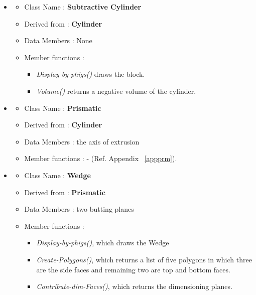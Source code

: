 \begin{itemize}
	\item

        \begin{itemize}
        \item   Class Name :    {\bf Subtractive Cylinder}
        \item   Derived from :  {\bf Cylinder}
        \item   Data Members :  None
        \item   Member functions :
                \begin{itemize}
                \item
                {\em Display-by-phigs()} draws the block.
				\item
				{\em Volume()} returns a negative volume of the cylinder.
                \end{itemize}
        \end{itemize}

	\item


        \begin{itemize}
        \item   Class Name :    {\bf Prismatic}
        \item   Derived from :  {\bf Cylinder}
        \item   Data Members :  the axis of extrusion
        \item   Member functions : - (Ref. Appendix ~\ref{appprm}).
        \end{itemize}

	\item

        \begin{itemize}
        \item   Class Name :    {\bf Wedge}
        \item   Derived from :  {\bf Prismatic}
        \item   Data Members :  two butting planes
        \item   Member functions : 

                \begin{itemize}
                \item
                {\em Display-by-phigs()}, which draws the Wedge
				\item
                {\em Create-Polygons()}, which returns a list of five polygons 
				in which three are the side faces and remaining two are top
                and bottom faces.
                \item
                {\em Contribute-dim-Faces()}, which returns the dimensioning 
				planes.
                \end{itemize}
        \end{itemize}


\end{itemize}
